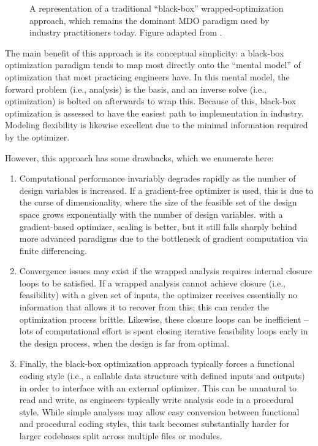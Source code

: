 \documentclass[12pt,vi,oneside,table]{report}
\begin{document}
\begin{appendices}
        \begin{figure}[H]
            \centering
            
            \caption{A representation of a traditional ``black-box'' wrapped-optimization approach, which remains the dominant MDO paradigm used by industry practitioners today. Figure adapted from \cite{drela_simultaneous_2010}.}
            \label{fig:nested}
        \end{figure}

        The main benefit of this approach is its conceptual simplicity: a black-box optimization paradigm tends to map most directly onto the ``mental model'' of optimization that most practicing engineers have. In this mental model, the forward problem (i.e., analysis) is the basis, and an inverse solve (i.e., optimization) is bolted on afterwards to wrap this. Because of this, black-box optimization is assessed to have the easiest path to implementation in industry. Modeling flexibility is likewise excellent due to the minimal information required by the optimizer.

        However, this approach has some drawbacks, which we enumerate here:
        \begin{enumerate}
            \item Computational performance invariably degrades rapidly as the number of design variables is increased. If a gradient-free optimizer is used, this is due to the curse of dimensionality, where the size of the feasible set of the design space grows exponentially with the number of design variables. with a gradient-based optimizer, scaling is better, but it still falls sharply behind more advanced paradigms due to the bottleneck of gradient computation via finite differencing.
            \item Convergence issues may exist if the wrapped analysis requires internal closure loops to be satisfied. If a wrapped analysis cannot achieve closure (i.e., feasibility) with a given set of inputs, the optimizer receives essentially no information that allows it to recover from this; this can render the optimization process brittle. Likewise, these closure loops can be inefficient -- lots of computational effort is spent closing iterative feasibility loops early in the design process, when the design is far from optimal.
            \item Finally, the black-box optimization approach typically forces a functional coding style (i.e., a callable data structure with defined inputs and outputs) in order to interface with an external optimizer. This can be unnatural to read and write, as engineers typically write analysis code in a procedural style. While simple analyses may allow easy conversion between functional and procedural coding styles, this task becomes substantially harder for larger codebases split across multiple files or modules.
        \end{enumerate}


\end{appendices}
\end{document}
